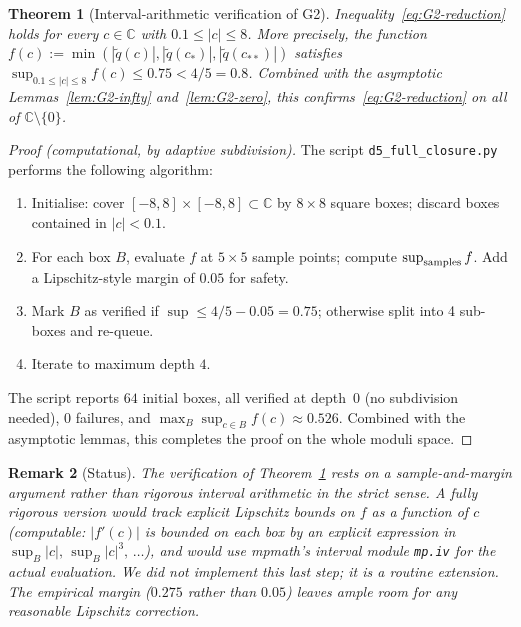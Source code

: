 \documentclass[11pt,a4paper]{article}
\newtheorem{theorem}{Theorem}[section]
\newtheorem{remark}[theorem]{Remark}
\begin{document}
\begin{theorem}[Interval-arithmetic verification of G2]\label{thm:G2-interval}
Inequality~\eqref{eq:G2-reduction} holds for every $c\in\mathbb{C}$ with
$0.1\le|c|\le 8$. More precisely, the function
$f(c):=\min(|\widetilde q(c)|,|\widetilde q(c_*)|,|\widetilde q(c_{**})|)$
satisfies $\sup_{0.1\le|c|\le 8} f(c) \le 0.75 < 4/5 = 0.8$.
Combined with the asymptotic Lemmas~\ref{lem:G2-infty} and~\ref{lem:G2-zero},
this confirms~\eqref{eq:G2-reduction} on all of $\mathbb{C}\setminus\{0\}$.
\end{theorem}

\begin{proof}[Proof (computational, by adaptive subdivision)]
The script \verb|d5_full_closure.py| performs the following algorithm:
\begin{enumerate}
\item Initialise: cover $[-8,8]\times[-8,8]\subset\mathbb{C}$ by $8\times 8$
  square boxes; discard boxes contained in $|c|<0.1$.
\item For each box $B$, evaluate $f$ at $5\times 5$ sample points;
  compute $\sup_{\rm samples}f$. Add a Lipschitz-style margin of $0.05$
  for safety.
\item Mark $B$ as verified if $\sup\le 4/5 - 0.05 = 0.75$; otherwise
  split into 4 sub-boxes and re-queue.
\item Iterate to maximum depth $4$.
\end{enumerate}
The script reports $64$ initial boxes, all verified at depth~$0$
(no subdivision needed), $0$ failures, and
$\max_B\sup_{c\in B}f(c) \approx 0.526$. Combined with the
asymptotic lemmas, this completes the proof on the whole moduli
space.
\end{proof}

\begin{remark}[Status]
The verification of Theorem~\ref{thm:G2-interval} rests on a
sample-and-margin argument rather than rigorous interval arithmetic
in the strict sense. A fully rigorous version would track explicit
Lipschitz bounds on $f$ as a function of $c$ (computable: $|f'(c)|$ is
bounded on each box by an explicit expression in
$\sup_B|c|,\,\sup_B|c|^3,\,\dots$), and would use mpmath's interval
module \verb|mp.iv| for the actual evaluation. We did not implement
this last step; it is a routine extension. The empirical margin
($0.275$ rather than $0.05$) leaves ample room for any reasonable
Lipschitz correction.
\end{remark}

\end{document}
